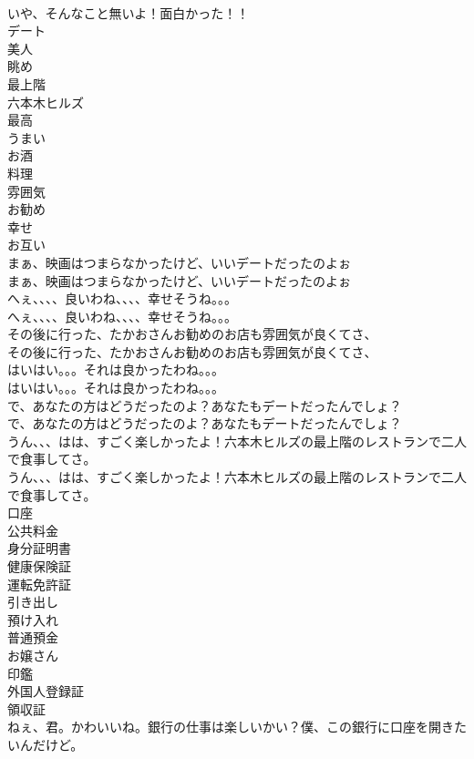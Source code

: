 \documentclass[8pt]{extreport}
\begin{document}
\begin{CJK}{UTF8}{min}
\\	いや、そんなこと無いよ！面白かった！！ 
\\	デート
\\	美人
\\	眺め
\\	最上階
\\	六本木ヒルズ
\\	最高
\\	うまい
\\	お酒
\\	料理
\\	雰囲気
\\	お勧め
\\	幸せ
\\	お互い
\\	まぁ、映画はつまらなかったけど、いいデートだったのよぉ	
\\	まぁ、映画はつまらなかったけど、いいデートだったのよぉ 
\\	へぇ、、、、良いわね、、、、幸せそうね。。。	
\\	へぇ、、、、良いわね、、、、幸せそうね。。。 
\\	その後に行った、たかおさんお勧めのお店も雰囲気が良くてさ、	
\\	その後に行った、たかおさんお勧めのお店も雰囲気が良くてさ、 
\\	はいはい。。。それは良かったわね。。。	
\\	はいはい。。。それは良かったわね。。。 
\\	で、あなたの方はどうだったのよ？あなたもデートだったんでしょ？	
\\	で、あなたの方はどうだったのよ？あなたもデートだったんでしょ？ 
\\	うん、、、はは、すごく楽しかったよ！六本木ヒルズの最上階のレストランで二人で食事してさ。	
\\	うん、、、はは、すごく楽しかったよ！六本木ヒルズの最上階のレストランで二人で食事してさ。 
\\	口座
\\	公共料金
\\	身分証明書
\\	健康保険証
\\	運転免許証
\\	引き出し
\\	預け入れ
\\	普通預金
\\	お嬢さん
\\	印鑑
\\	外国人登録証
\\	領収証
\\	ねぇ、君。かわいいね。銀行の仕事は楽しいかい？僕、この銀行に口座を開きたいんだけど。	

\end{CJK}
\end{document}
